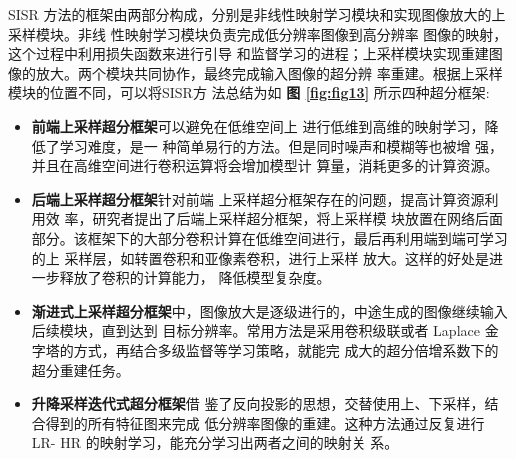 \begin{figure*}[!hb]
  \centering
  \begin{minipage}[b]{\linewidth} 
    \end{minipage}
  \caption{上采样模块位置不同的超分网络框架：(a) 前端上采样框架；(b) 后端上采样框架；(c) 渐进式上采样框架；(d) 升降采样迭代式框架}
  \label{fig:fig13}
\end{figure*}

SISR 方法的框架由两部分构成，分别是非线性映射学习模块和实现图像放大的上采样模块。非线 性映射学习模块负责完成低分辨率图像到高分辨率 图像的映射，这个过程中利用损失函数来进行引导 和监督学习的进程；上采样模块实现重建图像的放大。两个模块共同协作，最终完成输入图像的超分辨 率重建。根据上采样模块的位置不同，可以将SISR方 法总结为如 \textbf{图 \ref{fig:fig13}} 所示四种超分框架:

\begin{itemize}
	\item \textbf{前端上采样超分框架}可以避免在低维空间上 进行低维到高维的映射学习，降低了学习难度，是一 种简单易行的方法。但是同时噪声和模糊等也被增 强，并且在高维空间进行卷积运算将会增加模型计 算量，消耗更多的计算资源。
	\item \textbf{后端上采样超分框架}针对前端 上采样超分框架存在的问题，提高计算资源利用效 率，研究者提出了后端上采样超分框架，将上采样模 块放置在网络后面部分。该框架下的大部分卷积计算在低维空间进行，最后再利用端到端可学习的上 采样层，如转置卷积和亚像素卷积，进行上采样 放大。这样的好处是进一步释放了卷积的计算能力， 降低模型复杂度。
	\item \textbf{渐进式上采样超分框架}中，图像放大是逐级进行的，中途生成的图像继续输入后续模块，直到达到 目标分辨率。常用方法是采用卷积级联或者 Laplace 金字塔的方式，再结合多级监督等学习策略，就能完 成大的超分倍增系数下的超分重建任务。
	\item \textbf{升降采样迭代式超分框架}借 鉴了反向投影的思想，交替使用上、下采样，结合得到的所有特征图来完成 低分辨率图像的重建。这种方法通过反复进行 LR- HR 的映射学习，能充分学习出两者之间的映射关 系。
\end{itemize}

